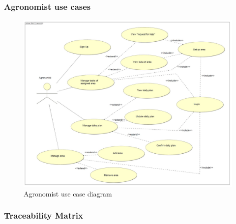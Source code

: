 \newpage

\subsubsection*{Agronomist use cases}
\begin{figure}[H]
	\centering
    \includegraphics[page=1, width=\textwidth]{Images/ud_ag.JPG}

	\caption{\label{fig:a_use_case_diagram}Agronomist use case diagram}

\end{figure}

\newpage
\label{sect:agronomist_requirements}



\subsubsection{Traceability Matrix}
\label{sec:traceability_matrix}

